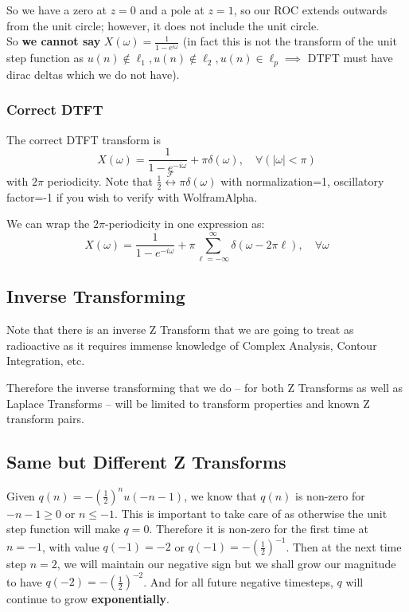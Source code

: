 So we have a zero at $z=0$ and a pole at $z=1$, so our ROC extends outwards from the unit circle; however, it does not include the unit circle. \\
So \textbf{we cannot say} $X(\omega)=\frac1{1-e^{i\omega}}$ (in fact this is not the transform of the unit step function as $u(n)\not\in\ell_1, u(n)\not\in\ell_2, u(n)\in\ell_p \implies$ DTFT must have dirac deltas which we do not have).

\subsubsection{Correct DTFT}
The correct DTFT transform is
\[
    X(\omega)=\frac1{1-e^{-i\omega}}+\pi\delta(\omega),\quad \forall(|\omega|<\pi)
\]
with $2\pi$ periodicity. Note that $\frac12\stackrel{\mathcal F}\leftrightarrow \pi\delta(\omega)$ with normalization=1, oscillatory factor=-1 if you wish to verify with WolframAlpha.

We can wrap the $2\pi$-periodicity in one expression as:
\[
    X(\omega)=\frac1{1-e^{-i\omega}}+\pi\sum_{\ell=-\infty}^\infty\delta(\omega-2\pi\ell),\quad \forall\omega
\]


\subsection{Inverse Transforming}
\begin{important}
Note that there is an inverse Z Transform that we are going to treat as radioactive as it requires immense knowledge of Complex Analysis, Contour Integration, etc.
\end{important}
Therefore the inverse transforming that we do -- for both Z Transforms as well as Laplace Transforms -- will be limited to transform properties and known Z transform pairs.

\hrulefill

\subsection{Same but Different Z Transforms}
Given $q(n)=-\left(\frac12\right)^n u(-n-1)$, we know that $q(n)$ is non-zero for $-n-1\ge0$ or $n\le-1$. This is important to take care of as otherwise the unit step function will make $q=0$. Therefore it is non-zero for the first time at $n=-1$, with value $q(-1)=-2$ or $q(-1)=-\left(\frac12\right)^{-1}$. Then at the next time step $n=2$, we will maintain our negative sign but we shall grow our magnitude to have $q(-2)=-\left(\frac12\right)^{-2}$. And for all future negative timesteps, $q$ will continue to grow \textbf{exponentially}.

